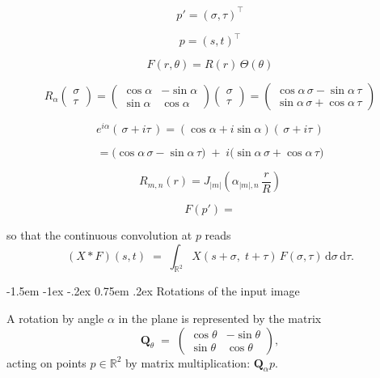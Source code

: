 \documentclass[12pt]{article}
\makeatletter
\renewcommand\subsection{\@startsection{subsection}{2}{\z@}%
                                     {-1.5em \@plus -1ex \@minus -.2ex}%
                                     {0.75em \@plus .2ex}%
                                     {\normalfont\large\bfseries}}
\makeatother
\begin{document}
\[
  p' = (\sigma,\tau)^\top
\]

\[
  p = (s,t)^\top
\]



\[
F(r,\theta) = R(r)\,\Theta(\theta)
\]




\[
R_\alpha
\begin{pmatrix}
\sigma \\[4pt]
\tau
\end{pmatrix}
=
\begin{pmatrix}
\cos\alpha & -\sin\alpha \\[4pt]
\sin\alpha & \cos\alpha
\end{pmatrix}
\begin{pmatrix}
\sigma \\[4pt]
\tau
\end{pmatrix}
=
\begin{pmatrix}
\cos\alpha\,\sigma - \sin\alpha\,\tau \\[4pt]
\sin\alpha\,\sigma + \cos\alpha\,\tau
\end{pmatrix}
\]

\[
e^{i\alpha}(\,\sigma + i\tau\,)
=
(\cos\alpha + i\sin\alpha)(\,\sigma + i\tau\,)
\]

\[
=
\bigl(\cos\alpha\,\sigma - \sin\alpha\,\tau\bigr)
\;+\;
i\bigl(\sin\alpha\,\sigma + \cos\alpha\,\tau\bigr)
\]







\begin{equation}
R_{m,n}(r)
=
J_{|m|}\!\left(\alpha_{|m|,n}\,\frac{r}{R}\right)
\end{equation}



\begin{equation}
F(p') = 
\end{equation}

so that the continuous convolution at $p$ reads
\begin{equation}
  \label{eq:conv-continuous}
  (X * F)(s,t)
  \;=\;
  \int_{\mathbb{R}^2}
  X(s + \sigma,\; t + \tau)\,
  F(\sigma,\tau)\,\mathrm{d}\sigma\,\mathrm{d}\tau.
\end{equation}

\subsection{Rotations of the input image}

A rotation by angle $\alpha$ in the plane is represented by the matrix
\begin{equation}
  \label{eq:rotation-matrix}
  \mathbf{Q}_\theta
  \;=\;
  \begin{pmatrix}
    \cos\theta & -\sin\theta \\
    \sin\theta & \cos\theta
  \end{pmatrix},
\end{equation}
acting on points $p \in \mathbb{R}^2$ by matrix multiplication:
$\mathbf{Q}_\alpha p$.
\end{document}

